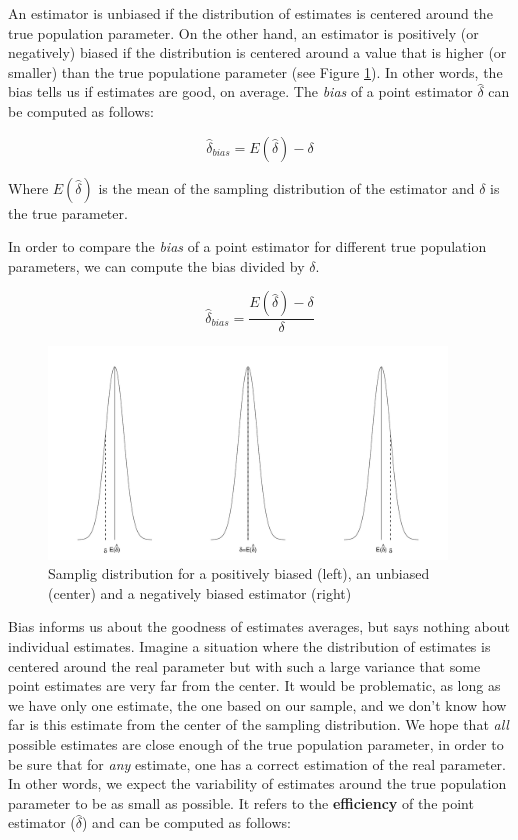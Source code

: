 \documentclass[man]{apa6}
\begin{document}
An estimator is unbiased if the distribution of estimates is centered around the true population parameter. On the other hand, an estimator is positively (or negatively) biased if the distribution is centered around a value that is higher (or smaller) than the true populatione parameter (see Figure \ref{fig:BIAS}). In other words, the bias tells us if estimates are good, on average. The \emph{bias} of a point estimator \(\hat{\delta}\) can be computed as follows:

\begin{equation} 
\hat{\delta}_{bias}=E(\hat{\delta})-\delta
\label{eq:BIAS}
\end{equation}

Where \(E(\hat{\delta})\) is the mean of the sampling distribution of the estimator and \(\delta\) is the true parameter.

In order to compare the \emph{bias} of a point estimator for different true population parameters, we can compute the bias divided by \(\delta\).

\begin{equation} 
\hat{\delta}_{bias}=\frac{E(\hat{\delta})-\delta}{\delta}
\label{eq:BIASRATE}
\end{equation}

\begin{figure}
\includegraphics[width=400px]{ES_files/figure-latex/BIAS-1} \caption{Samplig distribution for a positively biased (left), an unbiased (center) and a negatively biased estimator (right)}\label{fig:BIAS}
\end{figure}

Bias informs us about the goodness of estimates averages, but says nothing about individual estimates. Imagine a situation where the distribution of estimates is centered around the real parameter but with such a large variance that some point estimates are very far from the center. It would be problematic, as long as we have only one estimate, the one based on our sample, and we don't know how far is this estimate from the center of the sampling distribution. We hope that \emph{all} possible estimates are close enough of the true population parameter, in order to be sure that for \emph{any} estimate, one has a correct estimation of the real parameter. In other words, we expect the variability of estimates around the true population parameter to be as small as possible. It refers to the \textbf{efficiency} of the point estimator (\(\hat{\delta}\)) and can be computed as follows:
\end{document}
